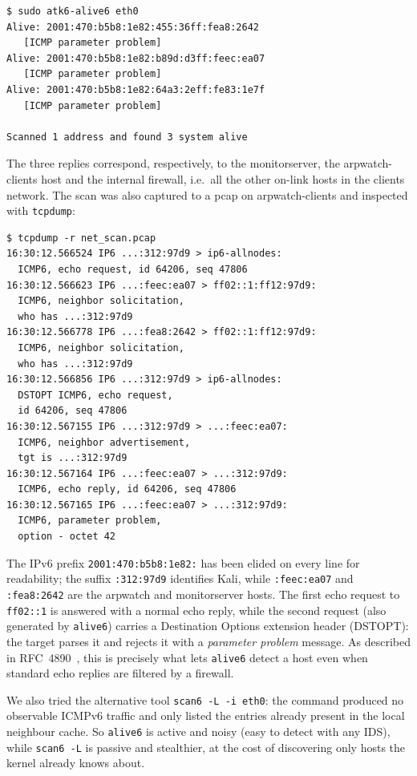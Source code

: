\documentclass[twocolumn]{NobArticle}
\begin{document}
\begin{lstlisting}
$ sudo atk6-alive6 eth0
Alive: 2001:470:b5b8:1e82:455:36ff:fea8:2642
   [ICMP parameter problem]
Alive: 2001:470:b5b8:1e82:b89d:d3ff:feec:ea07
   [ICMP parameter problem]
Alive: 2001:470:b5b8:1e82:64a3:2eff:fe83:1e7f
   [ICMP parameter problem]

Scanned 1 address and found 3 system alive
\end{lstlisting}

The three replies correspond, respectively, to the monitorserver, the
arpwatch-clients host and the internal firewall, i.e.\ all the other
on-link hosts in the clients network. The scan was also captured to a pcap
on arpwatch-clients and inspected with \texttt{tcpdump}:

\begin{lstlisting}
$ tcpdump -r net_scan.pcap
16:30:12.566524 IP6 ...:312:97d9 > ip6-allnodes:
  ICMP6, echo request, id 64206, seq 47806
16:30:12.566623 IP6 ...:feec:ea07 > ff02::1:ff12:97d9:
  ICMP6, neighbor solicitation,
  who has ...:312:97d9
16:30:12.566778 IP6 ...:fea8:2642 > ff02::1:ff12:97d9:
  ICMP6, neighbor solicitation,
  who has ...:312:97d9
16:30:12.566856 IP6 ...:312:97d9 > ip6-allnodes:
  DSTOPT ICMP6, echo request,
  id 64206, seq 47806
16:30:12.567155 IP6 ...:312:97d9 > ...:feec:ea07:
  ICMP6, neighbor advertisement,
  tgt is ...:312:97d9
16:30:12.567164 IP6 ...:feec:ea07 > ...:312:97d9:
  ICMP6, echo reply, id 64206, seq 47806
16:30:12.567165 IP6 ...:feec:ea07 > ...:312:97d9:
  ICMP6, parameter problem,
  option - octet 42
\end{lstlisting}

The IPv6 prefix \texttt{2001:470:b5b8:1e82:} has been elided on every line
for readability; the suffix \texttt{:312:97d9} identifies Kali, while
\texttt{:feec:ea07} and \texttt{:fea8:2642} are the arpwatch and monitorserver
hosts. The first echo request to \texttt{ff02::1} is answered with a normal
echo reply, while the second request (also generated by \texttt{alive6})
carries a Destination Options extension header (DSTOPT): the target parses
it and rejects it with a \textit{parameter problem} message. As described in
RFC~4890~\cite{rfc4890}, this is precisely what lets \texttt{alive6} detect
a host even when standard echo replies are filtered by a firewall.

We also tried the alternative tool \texttt{scan6 -L -i eth0}: the command
produced no observable ICMPv6 traffic and only listed the entries already
present in the local neighbour cache. So \texttt{alive6} is active and noisy
(easy to detect with any IDS), while \texttt{scan6 -L} is passive and
stealthier, at the cost of discovering only hosts the kernel already knows
about.
\end{document}
